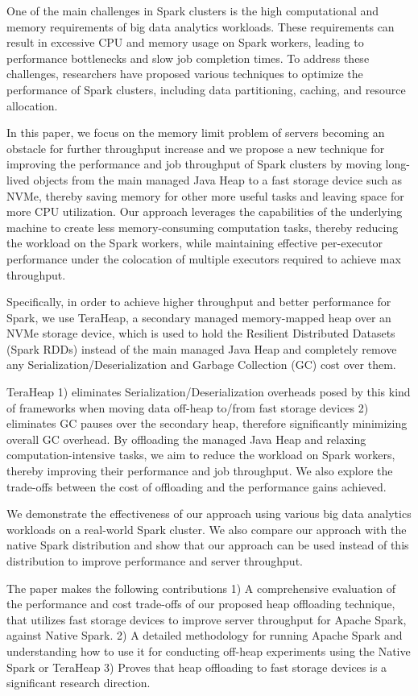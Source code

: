 \documentclass[twocolumn,10pt]{asme2e}
\begin{document}
One of the main challenges in Spark clusters is the high computational and memory requirements of big data analytics workloads. These requirements can result in excessive CPU and memory usage on Spark workers, leading to performance bottlenecks and slow job completion times. To address these challenges, researchers have proposed various techniques to optimize the performance of Spark clusters, including data partitioning, caching, and resource allocation.

In this paper, we focus on the memory limit problem of servers becoming an obstacle for further throughput increase and we propose a new technique for improving the performance and job throughput of Spark clusters by moving long-lived objects from the main managed Java Heap to a fast storage device such as NVMe, thereby saving memory for other more useful tasks and leaving space for more CPU utilization. Our approach leverages the capabilities of the underlying machine to create less memory-consuming computation tasks, thereby reducing the workload on the Spark workers, while maintaining effective per-executor performance under the colocation of multiple executors required to achieve max throughput.

Specifically, in order to achieve higher throughput and better performance for Spark, we use TeraHeap, a secondary managed memory-mapped heap over an NVMe storage device, which is used to hold the Resilient Distributed Datasets (Spark RDDs) instead of the main managed Java Heap and completely remove any Serialization/Deserialization and Garbage Collection (GC) cost over them.

TeraHeap 1) eliminates Serialization/Deserialization overheads posed by this kind of frameworks when moving data off-heap to/from fast storage devices 2) eliminates GC pauses over the secondary heap, therefore significantly minimizing overall GC overhead. By offloading the managed Java Heap and relaxing computation-intensive tasks, we aim to reduce the workload on Spark workers, thereby improving their performance and job throughput. We also explore the trade-offs between the cost of offloading and the performance gains achieved.

We demonstrate the effectiveness of our approach using various big data analytics workloads on a real-world Spark cluster. We also compare our approach with the native Spark distribution and show that our approach can be used instead of this distribution to improve performance and server throughput.

The paper makes the following contributions 1) A comprehensive evaluation of the performance and cost trade-offs of our proposed heap offloading technique, that utilizes fast storage devices to improve server throughput for Apache Spark, against Native Spark. 2) A detailed methodology for running Apache Spark and understanding how to use it for conducting off-heap experiments using the Native Spark or TeraHeap 3) Proves that heap offloading to fast storage devices is a significant research direction.
\end{document}
